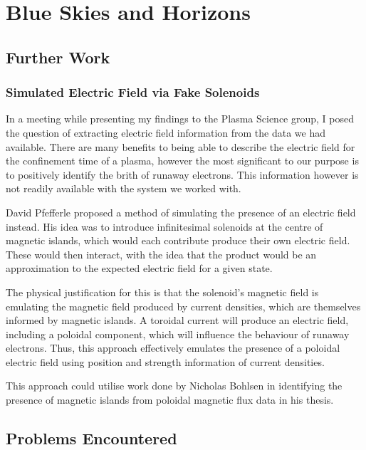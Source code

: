 
\chapter{Blue Skies and Horizons}
\label{chapter6}

\section{Further Work}

\subsection{Simulated Electric Field via Fake Solenoids}

In a meeting while presenting my findings to the Plasma Science group, I 
posed the question of extracting electric field information from the data 
we had available. There are many benefits to being able to describe the 
electric field for the confinement time of a plasma, however the 
most significant to our purpose is to positively identify the 
brith of runaway electrons. This information however is not readily 
available with the system we worked with.

David Pfefferle proposed a method of simulating the presence of 
an electric field instead. His idea was to introduce infinitesimal 
solenoids at the centre of magnetic islands, which would each contribute 
produce their own electric field. These would then interact, with the idea 
that the product would be an approximation to the expected 
electric field for a given state. 

The physical justification for this is that the solenoid's magnetic field is 
emulating the magnetic field produced by current densities, which 
are themselves informed by magnetic islands. A toroidal current 
will produce an electric field, including a poloidal component, which 
will influence the behaviour of runaway electrons. Thus, this approach 
effectively emulates the presence of a poloidal electric field using 
position and strength information of current densities.

This approach could utilise work done by Nicholas Bohlsen in identifying the presence 
of magnetic islands from poloidal magnetic flux data in his thesis.

\section{Problems Encountered}

\subsection{}

\subsection{}


